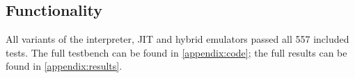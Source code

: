 \subsection{Functionality}

All variants of the interpreter, JIT and hybrid emulators passed all 557 included tests. The full testbench can be found in \autoref{appendix:code}; the full results can be found in \autoref{appendix:results}.

